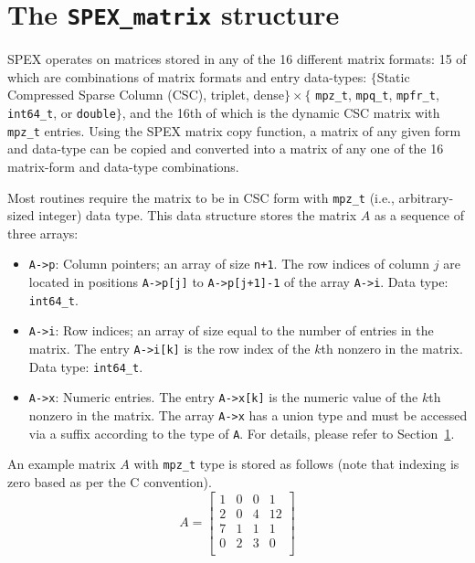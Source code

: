 \documentclass[12pt]{report}
\theoremstyle{definition}
\begin{document}
\section{The \texttt{SPEX\_matrix} structure} \label{ss:SPEX_matrix}

SPEX operates on matrices stored in any of the 16 different matrix formats: 15 of which are combinations of matrix formats and entry data-types: 
$\{$Static Compressed Sparse Column (CSC), triplet, dense$\} \times \{$ \verb|mpz_t|,
\verb|mpq_t|, \verb|mpfr_t|, \verb|int64_t|, or \verb|double|$\}$, and the 16th of which is the dynamic CSC matrix with \verb|mpz_t| entries. Using the SPEX matrix copy function, a matrix of any given form and data-type can be copied and converted into a matrix of any one of the 16 matrix-form and data-type combinations.

Most routines require the matrix to be in CSC form with \verb|mpz_t| (i.e., arbitrary-sized integer) data
type. This data structure stores the matrix $A$ as a sequence of three arrays:

\begin{itemize}
\item
\verb|A->p|: Column pointers; an array of size \verb|n+1|. The row indices of
column $j$ are located in positions \verb|A->p[j]| to \verb|A->p[j+1]-1| of the
array \verb|A->i|. Data type: \verb|int64_t|.

\item
\verb|A->i|: Row indices; an array of size equal to the number of entries in
the matrix. The entry \verb|A->i[k]| is the row index of the $k$th nonzero in
the matrix. Data type: \verb|int64_t|.

\item
\verb|A->x|: Numeric entries. The entry \verb|A->x[k]| is the numeric value of
the $k$th nonzero in the matrix.  The array \verb|A->x| has a union type and
must be accessed via a suffix according to the type of \verb|A|.  For details,
please refer to Section~\ref{ss:SPEX_matrix}.

\end{itemize}

An example matrix $A$ with \verb|mpz_t| type is stored as follows (note that indexing is zero based as per the C convention).
\[
A = \begin{bmatrix}
1 & 0 & 0 & 1 \\
2 & 0 & 4 & 12 \\
7 & 1 & 1 & 1 \\
0 & 2 & 3 & 0 \\
\end{bmatrix}
\]
\end{document}
